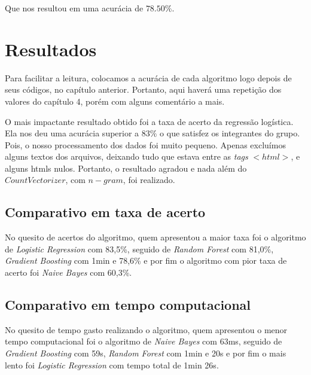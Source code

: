 \documentclass [12pt, a4paper] {article}
\begin{document}
Que nos resultou em uma acurácia de $78.50\%$.


\section{Resultados}

Para facilitar a leitura, colocamos a acurácia de cada algoritmo logo depois de seus códigos, no capítulo anterior. Portanto, aqui haverá uma repetição dos valores do capítulo 4, porém com alguns comentário a mais.

O mais impactante resultado obtido foi a taxa de acerto da regressão logística. Ela nos deu uma acurácia superior a $83\%$ o que satisfez os integrantes do grupo. Pois, o nosso processamento dos dados foi muito pequeno. Apenas excluímos alguns textos dos arquivos, deixando tudo que estava entre as \textit{tags} $<html>$, e alguns htmls nulos. Portanto, o resultado agradou e nada além do $CountVectorizer$, com $n-gram$, foi realizado.














\subsection{Comparativo em taxa de acerto}
No quesito de acertos do algoritmo, quem apresentou a maior taxa foi o algoritmo de \textit{Logistic Regression} com 83,5\%, seguido de \textit{Random Forest} com 81,0\%, \textit{Gradient Boosting} com 1min e 78,6\% e por fim o algoritmo com pior taxa de acerto foi \textit{Naive Bayes} com 60,3\%.

\subsection{Comparativo em tempo computacional}
No quesito de tempo gasto realizando o algoritmo, quem apresentou o menor tempo computacional foi o algoritmo de \textit{Naive Bayes} com 63ms, seguido de \textit{Gradient Boosting} com 59s, \textit{Random Forest} com 1min e 20s e por fim o mais lento foi \textit{Logistic Regression} com tempo total de 1min 26s.
\end{document}

